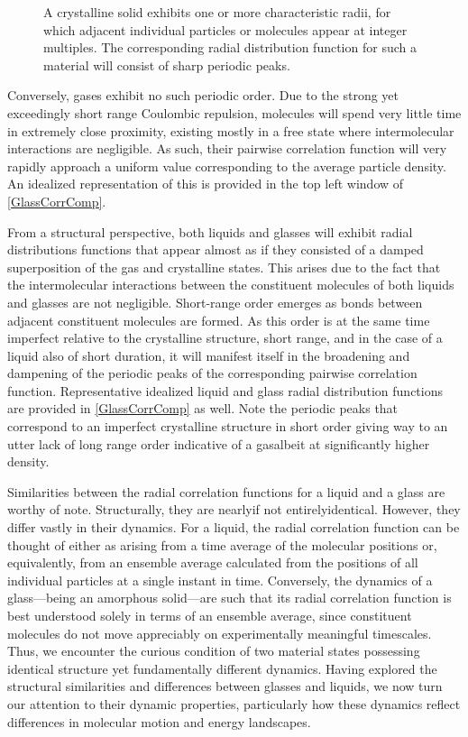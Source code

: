 \begin{figure} [!htbp]
\begin{tikzpicture}
	
	\end{tikzpicture}  \caption{A crystalline solid exhibits one or more characteristic radii, for which adjacent individual particles or molecules appear at integer multiples.  The corresponding radial distribution function for such a material will consist of sharp periodic peaks.} \label{distributionDefined} 
\end{figure} 

Conversely, gases exhibit no such periodic order.  Due to the strong yet exceedingly short range Coulombic repulsion, molecules will spend very little time in extremely close proximity, existing mostly in a free state where intermolecular interactions are negligible.  As such, their pairwise correlation function will very rapidly approach a uniform value corresponding to the average particle density.  An idealized representation of this is provided in the top left window of \fig \nolinebreak \ref{GlassCorrComp}.

From a structural perspective, both liquids and glasses will exhibit radial distributions functions that appear almost as if they consisted of a damped superposition of the gas and crystalline states.  This arises due to the fact that the intermolecular interactions between the constituent molecules of both liquids and glasses are not negligible.  Short-range order emerges as bonds between adjacent constituent molecules are formed.  As this order is at the same time imperfect relative to the crystalline structure, short range, and in the case of a liquid also of short duration, it will manifest itself in the broadening and dampening of the periodic peaks of the corresponding pairwise correlation function.  Representative idealized liquid and glass radial distribution functions are provided in \fig \nolinebreak \ref{GlassCorrComp} as well.  Note the periodic peaks that correspond to an imperfect crystalline structure in short order giving way to an utter lack of long range order indicative of a gas\textemdash albeit at significantly higher density.  

Similarities between the radial correlation functions for a liquid and a glass are worthy of note. Structurally, they are nearly\textemdash if not entirely\textemdash identical. However, they differ vastly in their dynamics. For a liquid, the radial correlation function can be thought of either as arising from a time average of the molecular positions or, equivalently, from an ensemble average calculated from the positions of all individual particles at a single instant in time. Conversely, the dynamics of a glass—being an amorphous solid—are such that its radial correlation function is best understood solely in terms of an ensemble average, since constituent molecules do not move appreciably on experimentally meaningful timescales. Thus, we encounter the curious condition of two material states possessing identical structure yet fundamentally different dynamics. Having explored the structural similarities and differences between glasses and liquids, we now turn our attention to their dynamic properties, particularly how these dynamics reflect differences in molecular motion and energy landscapes.

